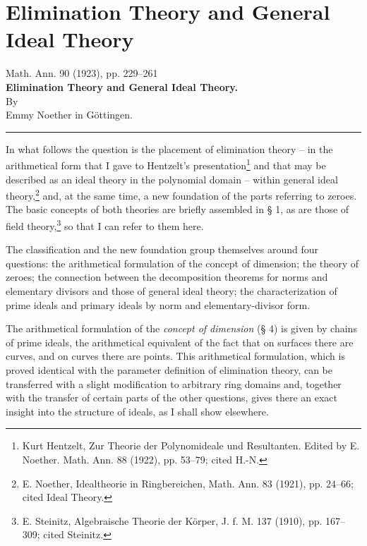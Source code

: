 \documentclass[11pt]{article}
\begin{document}
\section*{Elimination Theory and General Ideal Theory}
\begin{center}
Math. Ann. 90 (1923), pp. 229--261\\[0.9em]
{\Large\bfseries Elimination Theory and General Ideal Theory.}\\[1.0em]
By\\[0.45em]
Emmy Noether in Göttingen.\\[0.6em]
\rule{4em}{0.4pt}
\end{center}

In what follows the question is the placement of elimination theory -- in the arithmetical form that I gave to Hentzelt's presentation\footnote{Kurt Hentzelt, Zur Theorie der Polynomideale und Resultanten. Edited by E. Noether. Math. Ann. 88 (1922), pp. 53--79; cited H.-N.} and that may be described as an ideal theory in the polynomial domain -- within general ideal theory,\footnote{E. Noether, Idealtheorie in Ringbereichen, Math. Ann. 83 (1921), pp. 24--66; cited Ideal Theory.} and, at the same time, a new foundation of the parts referring to zeroes. The basic concepts of both theories are briefly assembled in § 1, as are those of field theory,\footnote{E. Steinitz, Algebraische Theorie der Körper, J. f. M. 137 (1910), pp. 167--309; cited Steinitz.} so that I can refer to them here.

The classification and the new foundation group themselves around four questions: the arithmetical formulation of the concept of dimension; the theory of zeroes; the connection between the decomposition theorems for norms and elementary divisors and those of general ideal theory; the characterization of prime ideals and primary ideals by norm and elementary-divisor form.

The arithmetical formulation of the \emph{concept of dimension} (§ 4) is given by chains of prime ideals, the arithmetical equivalent of the fact that on surfaces there are curves, and on curves there are points. This arithmetical formulation, which is proved identical with the parameter definition of elimination theory, can be transferred with a slight modification to arbitrary ring domains and, together with the transfer of certain parts of the other questions, gives there an exact insight into the structure of ideals, as I shall show elsewhere.
\end{document}
